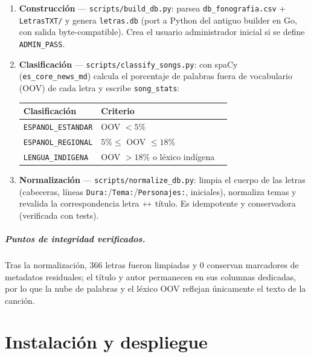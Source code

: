 \documentclass[11pt,letterpaper,twoside]{report}
\newcommand{\codigo}[1]{\texttt{#1}}
\begin{document}
\begin{enumerate}
  \item \textbf{Construcción} --- \codigo{scripts/build_db.py}: parsea
        \codigo{db_fonografia.csv} + \codigo{LetrasTXT/} y genera
        \codigo{letras.db} (port a Python del antiguo builder en Go,
        con salida byte-compatible). Crea el usuario administrador
        inicial si se define \codigo{ADMIN_PASS}.
  \item \textbf{Clasificación} --- \codigo{scripts/classify_songs.py}:
        con spaCy (\codigo{es_core_news_md}) calcula el porcentaje de
        palabras fuera de vocabulario (OOV) de cada letra y escribe
        \codigo{song_stats}:
        \begin{center}
        \begin{tabular}{lll}
          \toprule
          \textbf{Clasificación} & \textbf{Criterio} \\
          \midrule
          \codigo{ESPANOL_ESTANDAR}  & OOV $< 5\%$ \\
          \codigo{ESPANOL_REGIONAL}  & $5\% \le$ OOV $\le 18\%$ \\
          \codigo{LENGUA_INDIGENA}   & OOV $> 18\%$ o léxico indígena \\
          \bottomrule
        \end{tabular}
        \end{center}
  \item \textbf{Normalización} --- \codigo{scripts/normalize_db.py}:
        limpia el cuerpo de las letras (cabeceras, líneas
        \codigo{Dura:}/\codigo{Tema:}/\codigo{Personajes:}, iniciales),
        normaliza temas y revalida la correspondencia letra$\,\leftrightarrow\,$título.
        Es idempotente y conservadora (verificada con tests).
\end{enumerate}

\paragraph{Puntos de integridad verificados.}
Tras la normalización, 366 letras fueron limpiadas y 0 conservan
marcadores de metadatos residuales; el título y autor permanecen en
sus columnas dedicadas, por lo que la nube de palabras y el léxico OOV
reflejan únicamente el texto de la canción.

\chapter{Instalación y despliegue}
\label{cap:instalacion}
\end{document}
